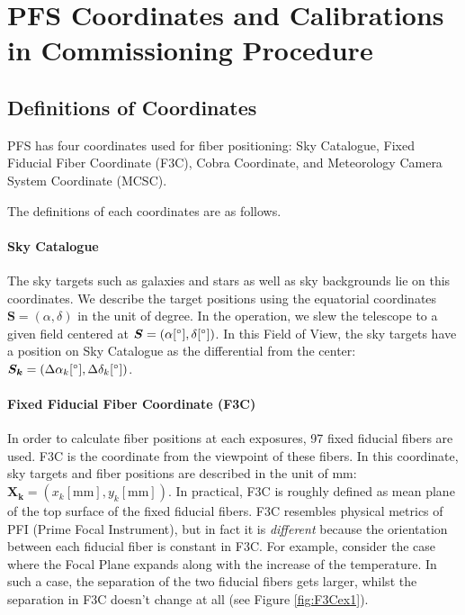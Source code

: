 \section{PFS Coordinates and Calibrations in Commissioning Procedure}

\subsection{Definitions of Coordinates}
PFS has four coordinates used for fiber positioning: Sky Catalogue, Fixed Fiducial Fiber Coordinate (F3C), Cobra Coordinate, and Meteorology Camera System Coordinate (MCSC).

The definitions of each coordinates are as follows.

\paragraph{Sky Catalogue}
The sky targets such as galaxies and stars as well as sky backgrounds lie on this coordinates.
We describe the target positions using the equatorial coordinates $\bm{S}=(\alpha , \delta)$ in the unit of degree.
In the operation, we slew the telescope to a given field centered at $\bm{S}=(\alpha [ ^\circ ], \delta [ ^\circ ])$.
In this Field of View, the sky targets have a position on Sky Catalogue as the differential from the center: $\bm{S_k}=(\Delta \alpha _k [ ^\circ ], \Delta \delta _k [ ^\circ ])$.

\paragraph{Fixed Fiducial Fiber Coordinate (F3C)}
In order to calculate fiber positions at each exposures, 97 fixed fiducial fibers are used.
F3C is the coordinate from the viewpoint of these fibers.
In this coordinate, sky targets and fiber positions are described in the unit of mm: $\bm{X_k}=(x_k [ \mathrm{mm} ], y_k [ \mathrm{mm} ])$.
In practical, F3C is roughly defined as  mean plane of the top surface of the fixed fiducial fibers.
F3C resembles physical metrics of PFI (Prime Focal Instrument), but in fact it is {\it different} because the orientation between each fiducial fiber is constant in F3C.
For example, consider the case where the Focal Plane expands along with the increase of the temperature.
In such a case, the separation of the two fiducial fibers gets larger, whilst the separation in F3C doesn't change at all (see Figure \ref{fig:F3Cex1}).

